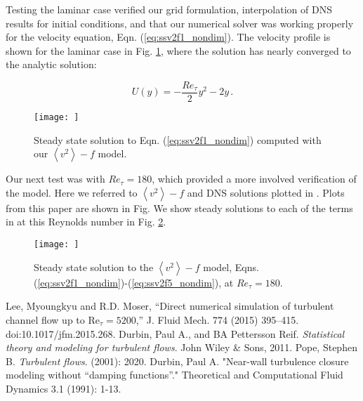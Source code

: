 \documentclass[a4paper,11pt]{article}
\newcommand{\chevron}[1]{\left\langle #1 \right\rangle}
\begin{document}
Testing the laminar case verified our grid formulation, interpolation of DNS
results for initial conditions, and that our numerical solver was working
properly for the velocity equation, Eqn.
(\ref{eq:ssv2f1_nondim}). The velocity profile is shown for the laminar case in Fig.
\ref{fig:laminar}, where the solution has nearly converged to the analytic
solution: 

\begin{equation*}
  U(y) = -\frac{Re_\tau}{2}y^2 - 2y \, .
\end{equation*}

\begin{figure}
 \centering
 \texttt{[image: ]}
 \caption{Steady state solution to Eqn. (\ref{eq:ssv2f1_nondim}) computed with
our $\chevron{v^2}-f$ model. }
 \label{fig:laminar}
\end{figure}

Our next test was with $Re_\tau = 180$, which provided a more involved
verification of the model. Here we referred to $\chevron{v^2} - f$ and DNS
solutions plotted in \cite{durbin180}. Plots from this paper are shown in Fig.  We show steady solutions to each of the terms in
at this Reynolds number in Fig. \ref{fig:results_180}.

\begin{figure}
 \centering
 \texttt{[image: ]}
 \caption{Steady state solution to the $\chevron{v^2}-f$ model, Eqns.
(\ref{eq:ssv2f1_nondim})-(\ref{eq:ssv2f5_nondim}), at $Re_\tau=180$. }
 \label{fig:results_180}
\end{figure}




\clearpage
\begin{thebibliography}{3}
Lee, Myoungkyu and R.D. Moser, ``Direct numerical simulation of turbulent channel flow up to $\mathrm{Re}_{\tau}=5200$,'' J. Fluid Mech. 774 (2015) 395–415. doi:10.1017/jfm.2015.268.
    Durbin, Paul A., and BA Pettersson Reif. \textit{Statistical theory and
modeling for turbulent flows}. John Wiley \& Sons, 2011.
        Pope, Stephen B. \textit{Turbulent flows}. (2001): 2020.
        Durbin, Paul A. "Near-wall turbulence closure modeling without “damping
functions”." Theoretical and Computational Fluid Dynamics 3.1 (1991): 1-13.
 
\newpage



\end{thebibliography}
\end{document}
